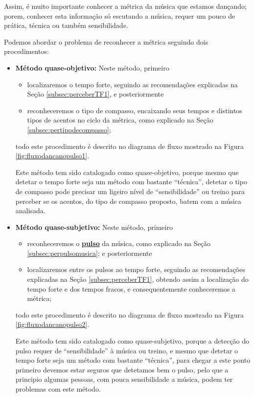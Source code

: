 Assim, é muito importante conhecer a métrica da música que estamos dançando;
porem, conhecer esta informação só escutando a música, requer um pouco de prática,
 técnica ou também sensibilidade.

Podemos abordar o problema de reconhecer a métrica seguindo dois procedimentos:
\begin{itemize}
\item \textbf{Método quase-objetivo:} Neste método, primeiro
\begin{itemize} 
\item localizaremos o tempo forte, seguindo as recomendações explicadas na Seção \ref{subsec:perceberTF1},
e posteriormente 
\item reconheceremos o tipo de compasso, 
encaixando seus tempos e distintos tipos de acentos no ciclo da métrica, 
como explicado na Seção \ref{subsec:pertipodecompasso};
\end{itemize}
todo este procedimento é descrito no diagrama de fluxo mostrado na Figura \ref{fig:fluxodancanopulso1}.

Este método tem sido catalogado como quase-objetivo,
porque mesmo que detetar o tempo forte seja um método com bastante ``técnica'',
detetar o tipo de compasso pode precisar um ligeiro nível de ``sensibilidade'' ou treino
para perceber se os acentos, do tipo de compasso proposto, batem com a música analisada. 
\item \textbf{Método quase-subjetivo:} Neste método, primeiro 
\begin{itemize}
\item reconheceremos o \hyperref[ref:Pulso]{\textbf{pulso}} da música, como explicado na Seção \ref{subsec:perpulsomusica};
e posteriormente 
\item localizaremos entre os pulsos ao tempo forte, 
seguindo as recomendações explicadas na Seção \ref{subsec:perceberTF1},
obtendo assim a localização do tempo forte e dos tempos fracos, e consequentemente conheceremos a métrica;
\end{itemize}
todo este procedimento é descrito no diagrama de fluxo mostrado na Figura \ref{fig:fluxodancanopulso2}.

Este método tem sido catalogado como quase-subjetivo,
porque a detecção do pulso requer de  ``sensibilidade'' à música ou treino,
e mesmo que detetar o tempo forte seja um método com bastante ``técnica'',
para chegar a este ponto primeiro devemos estar seguros que detetamos bem o pulso,
pelo que a principio algumas pessoas, com pouca sensibilidade a música, podem ter problemas com este método.
\end{itemize}

